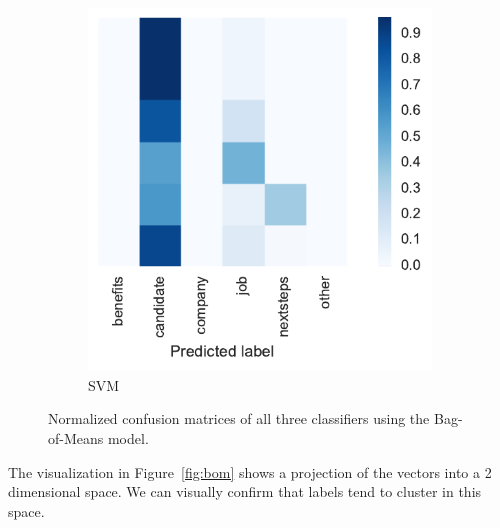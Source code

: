 \begin{figure}[h]
\begin{subfigure}[b]{0.345\textwidth}
        \includegraphics[width=\textwidth]{img/exp-vector-space/bom-conf-matrix-svm-normalized.pdf}
        \caption{SVM}
\label{fig:bom-conf-matrix-svm-normalized}
    \end{subfigure}
    \caption{Normalized confusion matrices of all three classifiers using the Bag-of-Means model.}
\label{fig:bom-conf-matrix}
\end{figure}

The visualization in Figure~\ref{fig:bom} shows a projection of the vectors into a 2 dimensional space. We can visually confirm that labels tend to cluster in this space.

